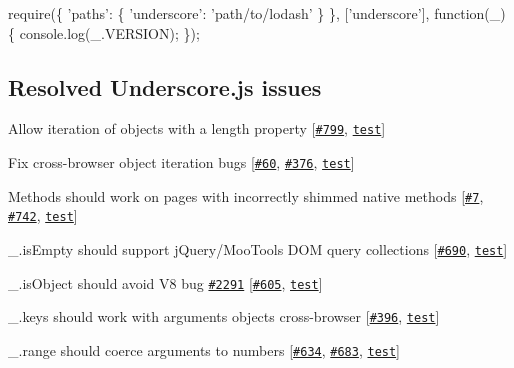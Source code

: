 \begin{DoxyCode}
require(\{
  \textcolor{stringliteral}{'paths'}: \{
    \textcolor{stringliteral}{'underscore'}: \textcolor{stringliteral}{'path/to/lodash'}
  \}
\},
[\textcolor{stringliteral}{'underscore'}], \textcolor{keyword}{function}(\_) \{
  console.log(\_.VERSION);
\});
\end{DoxyCode}


\subsection*{Resolved Underscore.\+js issues}


\begin{DoxyItemize}
\item Allow iteration of objects with a {\ttfamily length} property \mbox{[}\href{https://github.com/documentcloud/underscore/pull/799}{\tt \#799}, \href{https://github.com/lodash/lodash/blob/0.9.2/test/test.js#L545-551}{\tt test}\mbox{]}
\item Fix cross-\/browser object iteration bugs \mbox{[}\href{https://github.com/documentcloud/underscore/issues/60}{\tt \#60}, \href{https://github.com/documentcloud/underscore/issues/376}{\tt \#376}, \href{https://github.com/lodash/lodash/blob/0.9.2/test/test.js#L558-582}{\tt test}\mbox{]}
\item Methods should work on pages with incorrectly shimmed native methods \mbox{[}\href{https://github.com/documentcloud/underscore/issues/7}{\tt \#7}, \href{https://github.com/documentcloud/underscore/issues/742}{\tt \#742}, \href{https://github.com/lodash/lodash/blob/0.9.2/test/test.js#L140-146}{\tt test}\mbox{]}
\item {\ttfamily \+\_\+.\+is\+Empty} should support j\+Query/\+Moo\+Tools D\+O\+M query collections \mbox{[}\href{https://github.com/documentcloud/underscore/pull/690}{\tt \#690}, \href{https://github.com/lodash/lodash/blob/0.9.2/test/test.js#L747-752}{\tt test}\mbox{]}
\item {\ttfamily \+\_\+.\+is\+Object} should avoid V8 bug \href{http://code.google.com/p/8/issues/detail?id=2291}{\tt \#2291} \mbox{[}\href{https://github.com/documentcloud/underscore/issues/605}{\tt \#605}, \href{https://github.com/lodash/lodash/blob/0.9.2/test/test.js#L828-840}{\tt test}\mbox{]}
\item {\ttfamily \+\_\+.\+keys} should work with {\ttfamily arguments} objects cross-\/browser \mbox{[}\href{https://github.com/documentcloud/underscore/issues/396}{\tt \#396}, \href{https://github.com/lodash/lodash/blob/0.9.2/test/test.js#L921-923}{\tt test}\mbox{]}
\item {\ttfamily \+\_\+.\+range} should coerce arguments to numbers \mbox{[}\href{https://github.com/documentcloud/underscore/issues/634}{\tt \#634}, \href{https://github.com/documentcloud/underscore/issues/683}{\tt \#683}, \href{https://github.com/lodash/lodash/blob/0.9.2/test/test.js#L1337-1340}{\tt test}\mbox{]}
\end{DoxyItemize}

